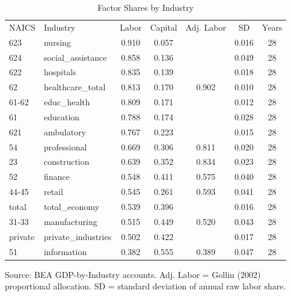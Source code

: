 \begin{table}[htbp]
\centering
\caption{Factor Shares by Industry}
\label{tab:factor_shares}
\begin{tabular}{llccccc}
\toprule
NAICS & Industry & Labor & Capital & Adj. Labor & SD & Years \\
623&nursing&0.910&0.057&&0.016&28\\
624&social_assistance&0.858&0.136&&0.049&28\\
622&hospitals&0.835&0.139&&0.018&28\\
62&healthcare_total&0.813&0.170&0.902&0.010&28\\
61-62&educ_health&0.809&0.171&&0.012&28\\
61&education&0.788&0.174&&0.028&28\\
621&ambulatory&0.767&0.223&&0.015&28\\
54&professional&0.669&0.306&0.811&0.020&28\\
23&construction&0.639&0.352&0.834&0.023&28\\
52&finance&0.548&0.411&0.575&0.040&28\\
44-45&retail&0.545&0.261&0.593&0.041&28\\
total&total_economy&0.539&0.396&&0.016&28\\
31-33&manufacturing&0.515&0.449&0.520&0.043&28\\
private&private_industries&0.502&0.422&&0.017&28\\
51&information&0.382&0.555&0.389&0.047&28\\
\bottomrule
\end{tabular}
\begin{tablenotes}
\small
\item Source: BEA GDP-by-Industry accounts. 
Adj. Labor = Gollin (2002) proportional allocation. 
SD = standard deviation of annual raw labor share.
\end{tablenotes}
\end{table}
